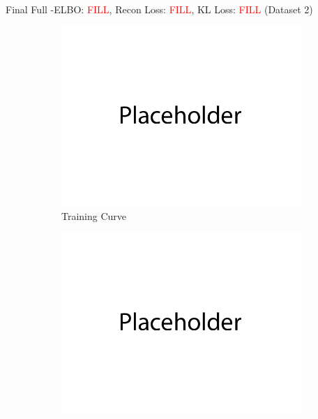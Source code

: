 \documentclass{article}
\begin{document}
\begin{enumerate}[(a)]
     Final Full -ELBO: \textcolor{red}{FILL}, Recon Loss: \textcolor{red}{FILL}, KL Loss: \textcolor{red}{FILL} (Dataset 2)
     \begin{figure}[H]
            \centering
            \begin{subfigure}[b]{0.475\textwidth}
                \centering
                \includegraphics[width=\textwidth]{figures/q2_a_dset2_train_plot.png}
                \caption{Training Curve}
            \end{subfigure}
            \hfill
            \begin{subfigure}[b]{0.475\textwidth}
                \centering
                \includegraphics[width=\textwidth]{figures/q2_a_dset2_samples.png}

\end{subfigure}
\end{figure}
\end{enumerate}
\end{document}
